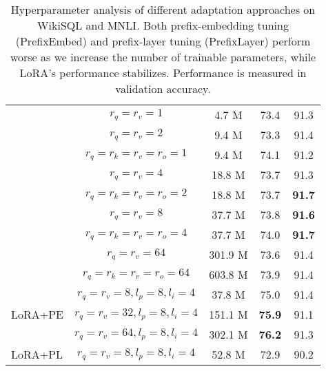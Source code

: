 \documentclass{article} %
\begin{document}
\begin{table}[h]
\begin{tabular}{l|c|c|c|c}
                             & $r_q=r_v=1 $ & 4.7 M & 73.4 & 91.3 \\
                             & $r_q=r_v=2 $ & 9.4 M & 73.3 & 91.4 \\
                             & $r_q=r_k=r_v=r_o=1$ & 9.4 M & 74.1 & 91.2 \\
                             & $r_q=r_v=4 $ & 18.8 M & 73.7 & 91.3 \\
                             & $r_q=r_k=r_v=r_o=2$ & 18.8 M & 73.7 & \textbf{91.7} \\
                             & $r_q=r_v=8$ & 37.7 M & 73.8 & \textbf{91.6} \\
                             & $r_q=r_k=r_v=r_o=4$ & 37.7 M & 74.0 & \textbf{91.7} \\
                             & $r_q=r_v=64$ & 301.9 M & 73.6 & 91.4 \\
                             & $r_q=r_k=r_v=r_o=64$ & 603.8 M & 73.9 & 91.4 \\
\midrule
\multirow{3}{*}{LoRA+PE}     & $r_q=r_v=8, l_p=8, l_i=4$ & 37.8 M & 75.0 & 91.4\\
                             & $r_q=r_v=32, l_p=8, l_i=4$ &151.1 M & \textbf{75.9} & 91.1\\
                             & $r_q=r_v=64, l_p=8, l_i=4$ &302.1 M & \textbf{76.2}  & 91.3\\
\midrule
\multirow{1}{*}{LoRA+PL} & $r_q=r_v=8, l_p=8, l_i=4$ & 52.8 M & 72.9 & 90.2\\
\bottomrule
\end{tabular}
\caption{Hyperparameter analysis of different adaptation approaches on WikiSQL and MNLI. Both prefix-embedding tuning (PrefixEmbed) and prefix-layer tuning (PrefixLayer) perform worse as we increase the number of trainable parameters, while LoRA's performance stabilizes. Performance is measured in validation accuracy.}
\label{tab:gpt3_ft_results_detailed}
\end{table}
\end{document}
